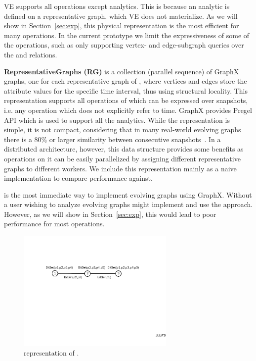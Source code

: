 VE supports all \tga operations except analytics.  This is because an
analytic is defined on a representative graph, which VE does not
materialize.  As we will show in Section~\ref{sec:exp}, this physical
representation is the most efficient for many operations.  In the
current prototype we limit the expressiveness of some of the
operations, such as only supporting vertex- and edge-subgraph queries
over the \tav and \tae relations.

{\bf RepresentativeGraphs (RG)} is a collection (parallel sequence) of
GraphX graphs, one for each representative graph of \ttt, where
vertices and edges store the attribute values for the specific time
interval, thus using structural locality.  This representation
supports all operations of \tga which can be expressed over snapshots,
i.e. any operation which does not explicitly refer to time.  GraphX
provides Pregel API which is used to support all the analytics.
%
While the \rg representation is simple, it is not compact, considering
that in many real-world evolving graphs there is a 80\% or larger
similarity between consecutive snapshots~\cite{Miao2015}.  In a
distributed architecture, however, this data structure provides some
benefits as operations on it can be easily parallelized by assigning
different representative graphs to different workers.  We include this
representation mainly as a naive implementation to compare performance
against.

\rg is the most immediate way to implement evolving graphs using
GraphX. Without \ql a user wishing to analyze evolving graphs might
implement and use the \rg approach.  However, as we will show in
Section~\ref{sec:exp}, this would lead to poor performance for most
operations.

\begin{figure}[t!]
\centering
\includegraphics[width=3in]{figs/ogc.pdf}
\vspace{-0.2cm}
\caption{\og representation of .}
\vspace{-0.1cm}
\label{fig:ogc}
\end{figure}

